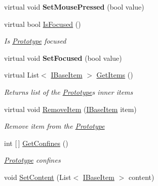 \begin{DoxyCompactItemize}
\mbox{\label{class_space_v_i_l_1_1_prototype_acef7830db4bf07583eea2f6057258d6d}} 
virtual void {\bfseries Set\+Mouse\+Pressed} (bool value)
\item 
virtual bool \mbox{\hyperlink{class_space_v_i_l_1_1_prototype_aa89bae9f05c9cfce9c1dda5231b3b321}{Is\+Focused}} ()
\begin{DoxyCompactList}\small\item\em Is \mbox{\hyperlink{class_space_v_i_l_1_1_prototype}{Prototype}} focused \end{DoxyCompactList}\item 
\mbox{\label{class_space_v_i_l_1_1_prototype_a26f69bbb1e267956b567aaf6181dc345}} 
virtual void {\bfseries Set\+Focused} (bool value)
\item 
virtual List$<$ \mbox{\hyperlink{interface_space_v_i_l_1_1_core_1_1_i_base_item}{I\+Base\+Item}} $>$ \mbox{\hyperlink{class_space_v_i_l_1_1_prototype_a6d5e123222980d052f762368a17b6826}{Get\+Items}} ()
\begin{DoxyCompactList}\small\item\em Returns list of the \mbox{\hyperlink{class_space_v_i_l_1_1_prototype}{Prototype}}\textquotesingle{}s inner items \end{DoxyCompactList}\item 
virtual void \mbox{\hyperlink{class_space_v_i_l_1_1_prototype_a7a2aabccfe6389f71d0265fa73f0ae87}{Remove\+Item}} (\mbox{\hyperlink{interface_space_v_i_l_1_1_core_1_1_i_base_item}{I\+Base\+Item}} item)
\begin{DoxyCompactList}\small\item\em Remove item from the \mbox{\hyperlink{class_space_v_i_l_1_1_prototype}{Prototype}} \end{DoxyCompactList}\item 
int \mbox{[}$\,$\mbox{]} \mbox{\hyperlink{class_space_v_i_l_1_1_prototype_a5d6fa221e52785b78d1e3cd706a38abb}{Get\+Confines}} ()
\begin{DoxyCompactList}\small\item\em \mbox{\hyperlink{class_space_v_i_l_1_1_prototype}{Prototype}} confines \end{DoxyCompactList}\item 
void \mbox{\hyperlink{class_space_v_i_l_1_1_prototype_aae3089e9f3585ccbf1b5a935cf0c0b27}{Set\+Content}} (List$<$ \mbox{\hyperlink{interface_space_v_i_l_1_1_core_1_1_i_base_item}{I\+Base\+Item}} $>$ content)

\end{DoxyCompactItemize}
